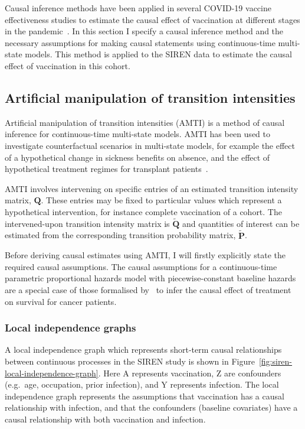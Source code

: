 Causal inference methods have been applied in several COVID-19 vaccine effectiveness studies to estimate the causal effect of vaccination at different stages in the pandemic~\parencite{Dagan2021-ow, Xie2022-np, Hulme2023-fw}. In this section I specify a causal inference method and the necessary assumptions for making causal statements using continuous-time multi-state models. This method is applied to the SIREN data to estimate the causal effect of vaccination in this cohort.

\subsection{Artificial manipulation of transition intensities}

Artificial manipulation of transition intensities (AMTI) is a method of causal inference for continuous-time multi-state models. AMTI has been used to investigate counterfactual scenarios in multi-state models, for example the effect of a hypothetical change in sickness benefits on absence, and the effect of hypothetical treatment regimes for transplant patients~\parencite{Keiding2001-lk, Gran2015-fc}.

AMTI involves intervening on specific entries of an estimated transition intensity matrix, $\mathbf{Q}$. These entries may be fixed to particular values which represent a hypothetical intervention, for instance complete vaccination of a cohort. The intervened-upon transition intensity matrix is $\mathbf{{\tilde{Q}}}$ and quantities of interest can be estimated from the corresponding transition probability matrix, $\mathbf{{\tilde{P}}}$.

Before deriving causal estimates using AMTI, I will firstly explicitly state the required causal assumptions. The causal assumptions for a continuous-time parametric proportional hazards model with piecewise-constant baseline hazards are a special case of those formalised by~\cite{Ryalen2020-nl} to infer the causal effect of treatment on survival for cancer patients.

\subsubsection{Local independence graphs}

A local independence graph which represents short-term causal relationships between continuous processes in the SIREN study is shown in Figure~\ref{fig:siren-local-independence-graph}. Here A represents vaccination, Z are confounders (e.g.\ age, occupation, prior infection), and Y represents infection. The local independence graph represents the assumptions that vaccination has a causal relationship with infection, and that the confounders (baseline covariates) have a causal relationship with both vaccination and infection.

